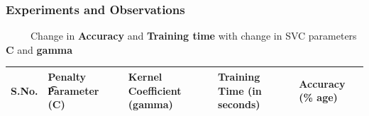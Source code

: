 \documentclass{beamer}
\newcommand\tab[1][1cm]{\hspace*{#1}}
\begin{document}
\begin{frame}
\Huge
{}
\end{frame}

\begin{frame}[t, allowframebreaks]
\frametitle{\tab \tab \tab \Large Experiments and Observations}
\fontsize{8}{9.6}\selectfont
\ \ \ \ \ Change in \textbf{Accuracy} and \textbf{Training time} with change in SVC parameters \textbf{C} and \textbf{gamma}
\linebreak

\begin{vwcol}[widths={6.5,3.0}, sep=.8cm, justify=flush, rule=0pt, indent=1em]
\begin{minipage}{0.7\linewidth}
\tiny
\begin{table}[!h]
\label{Fig:}

\begin{tabular}{|p{0.4cm}|p{1.0cm}|p{1.0cm}|p{1.6cm}|p{1.7cm}|}
\hline
\textbf{S.No.} & \textbf{Penalty \t Parameter (C)} & \textbf{Kernel \linebreak Coefficient (gamma)} & \textbf{Training Time (in seconds)} & \textbf{Accuracy \linebreak (\% age)} \\ \hline


\end{tabular}
\end{table}
\end{minipage}
\end{vwcol}
\end{frame}
\end{document}
